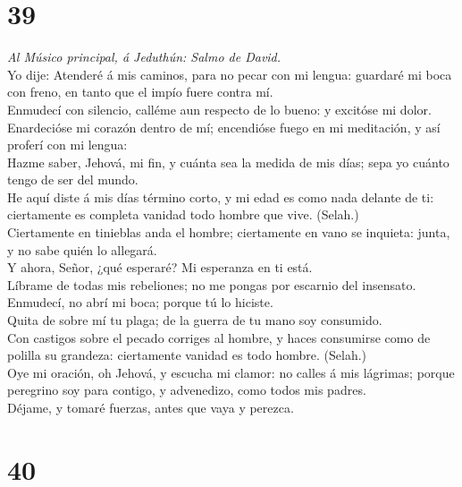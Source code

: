 \hypertarget{section-38}{%
\section{39}\label{section-38}}

 \emph{Al Músico principal, á Jeduthún: Salmo de David.}\\
Yo dije: Atenderé á mis caminos, para no pecar con mi lengua: guardaré
mi boca con freno, en tanto que el impío fuere contra mí.\\
 Enmudecí con silencio, calléme aun respecto de lo bueno: y
excitóse mi dolor.\\
 Enardecióse mi corazón dentro de mí; encendióse fuego en mi
meditación, y así proferí con mi lengua:\\
 Hazme saber, Jehová, mi fin, y cuánta sea la medida de mis
días; sepa yo cuánto tengo de ser del mundo.\\
 He aquí diste á mis días término corto, y mi edad es como
nada delante de ti: ciertamente es completa vanidad todo hombre que
vive. (Selah.)\\
 Ciertamente en tinieblas anda el hombre; ciertamente en
vano se inquieta: junta, y no sabe quién lo allegará.\\
 Y ahora, Señor, ¿qué esperaré? Mi esperanza en ti está.\\
 Líbrame de todas mis rebeliones; no me pongas por escarnio
del insensato.\\
 Enmudecí, no abrí mi boca; porque tú lo hiciste.\\
 Quita de sobre mí tu plaga; de la guerra de tu mano soy
consumido.\\
 Con castigos sobre el pecado corriges al hombre, y haces
consumirse como de polilla su grandeza: ciertamente vanidad es todo
hombre. (Selah.)\\
 Oye mi oración, oh Jehová, y escucha mi clamor: no calles
á mis lágrimas; porque peregrino soy para contigo, y advenedizo, como
todos mis padres.\\
 Déjame, y tomaré fuerzas, antes que vaya y perezca.

\hypertarget{section-39}{%
\section{40}\label{section-39}}

